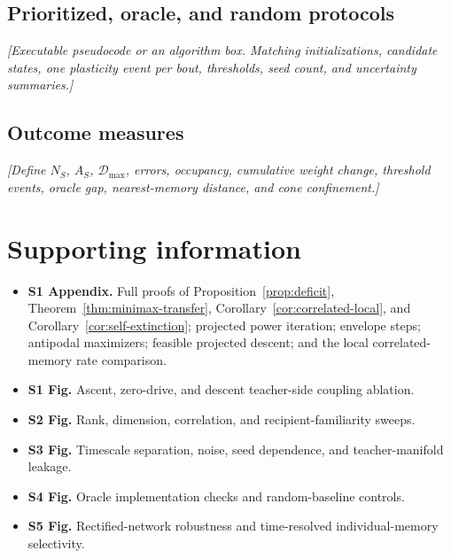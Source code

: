 \documentclass[10pt,letterpaper]{article}
\theoremstyle{plain}
\theoremstyle{remark}
\begin{document}
\subsection{Prioritized, oracle, and random protocols}
\textit{[Executable pseudocode or an algorithm box. Matching initializations, candidate states, one plasticity event per bout, thresholds, seed count, and uncertainty summaries.]}

\subsection{Outcome measures}
\textit{[Define $N_S$, $A_S$, $\mathcal D_{\max}$, errors, occupancy, cumulative weight change, threshold events, oracle gap, nearest-memory distance, and cone confinement.]}

\section*{Supporting information}

\begin{itemize}
\item \textbf{S1 Appendix.} Full proofs of Proposition~\ref{prop:deficit}, Theorem~\ref{thm:minimax-transfer}, Corollary~\ref{cor:correlated-local}, and Corollary~\ref{cor:self-extinction}; projected power iteration; envelope steps; antipodal maximizers; feasible projected descent; and the local correlated-memory rate comparison.
\item \textbf{S1 Fig.} Ascent, zero-drive, and descent teacher-side coupling ablation.
\item \textbf{S2 Fig.} Rank, dimension, correlation, and recipient-familiarity sweeps.
\item \textbf{S3 Fig.} Timescale separation, noise, seed dependence, and teacher-manifold leakage.
\item \textbf{S4 Fig.} Oracle implementation checks and random-baseline controls.
\item \textbf{S5 Fig.} Rectified-network robustness and time-resolved individual-memory selectivity.
\end{itemize}



\end{document}
